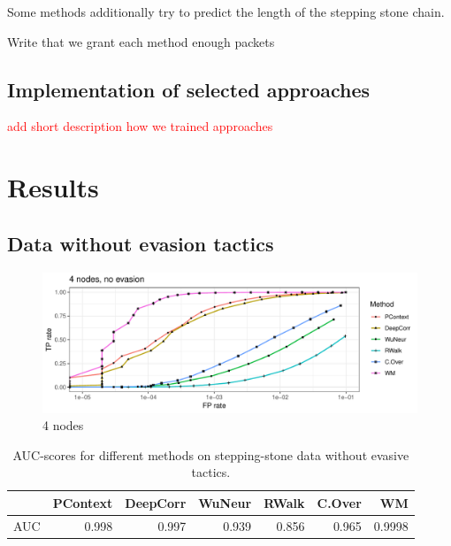\documentclass[runningheads]{llncs}\usepackage[]{graphicx}\usepackage[]{color}
\makeatletter
\def\maxwidth{ %
  \ifdim\Gin@nat@width>\linewidth
    \linewidth
  \else
    \Gin@nat@width
  \fi
}
\newenvironment{knitrout}{}{} %
\makeatother
\begin{document}
Some methods additionally try to predict the length of the stepping stone chain.

Write that we grant each method enough packets

\subsection{Implementation of selected approaches}

\textcolor{red}{add short description how we trained approaches}

\section{Results}\label{Sec:Results}


\subsection{Data without evasion tactics}

\begin{knitrout}
\color{fgcolor}\begin{figure}
\includegraphics[width=\maxwidth]{figure/Noevasion_4nodes-1} \caption[4 nodes]{4 nodes}\label{fig:Noevasion_4nodes}
\end{figure}


\end{knitrout}

\begin{table}
\centering
\begin{tabular}{l|r|r|r|r|r|r}
  \hline
 & PContext & DeepCorr & WuNeur & RWalk & C.Over & WM \\ 
  \hline
AUC & 0.998 & 0.997 & 0.939 & 0.856 & 0.965 & 0.9998 \\ 
   \hline
\end{tabular}

\caption{AUC-scores for different methods on stepping-stone data without evasive tactics.}\label{Tab:dfAUC}
\end{table}
\end{document}
